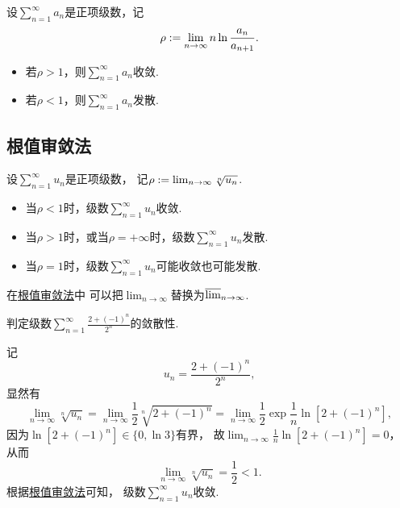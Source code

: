 \begin{proposition}
设\(\sum_{n=1}^\infty a_n\)是正项级数，记\[
	\rho := \lim_{n\to\infty} n \ln\frac{a_n}{a_{n+1}}.
\]
\begin{itemize}
	\item 若\(\rho>1\)，则\(\sum_{n=1}^\infty a_n\)收敛.
	\item 若\(\rho<1\)，则\(\sum_{n=1}^\infty a_n\)发散.
\end{itemize}
\end{proposition}

\subsection{根值审敛法}
\begin{theorem}[柯西根值审敛法]\label{theorem:无穷级数.正项级数的根值审敛法}
设\(\sum_{n=1}^\infty u_n\)是正项级数，
记\(\rho := \lim_{n\to\infty} \sqrt[n]{u_n}\).
\begin{itemize}
	\item 当\(\rho<1\)时，级数\(\sum_{n=1}^\infty u_n\)收敛.
	\item 当\(\rho>1\)时，或当\(\rho=+\infty\)时，级数\(\sum_{n=1}^\infty u_n\)发散.
	\item 当\(\rho=1\)时，级数\(\sum_{n=1}^\infty u_n\)可能收敛也可能发散.
\end{itemize}
\end{theorem}
在\hyperref[theorem:无穷级数.正项级数的根值审敛法]{根值审敛法}中
可以把\(\lim_{n\to\infty}\)替换为\(\varlimsup_{n\to\infty}\).

\begin{example}
判定级数\(\sum_{n=1}^\infty \frac{2+(-1)^n}{2^n}\)的敛散性.
\begin{solution}
记\[
	u_n = \frac{2+(-1)^n}{2^n},
\]
显然有\[
	\lim_{n\to\infty} \sqrt[n]{u_n}
	= \lim_{n\to\infty} \frac{1}{2} \sqrt[n]{2+(-1)^n}
	= \lim_{n\to\infty} \frac{1}{2} \exp{\frac{1}{n} \ln[2+(-1)^n]},
\]
因为\(\ln[2+(-1)^n] \in \{ 0, \ln3 \}\)有界，
故\(\lim_{n\to\infty} \frac{1}{n} \ln[2+(-1)^n] = 0\)，
从而\[
	\lim_{n\to\infty} \sqrt[n]{u_n} = \frac{1}{2} < 1.
\]
根据\hyperref[theorem:无穷级数.正项级数的根值审敛法]{根值审敛法}可知，
级数\(\sum_{n=1}^\infty u_n\)收敛.
\end{solution}
\end{example}

